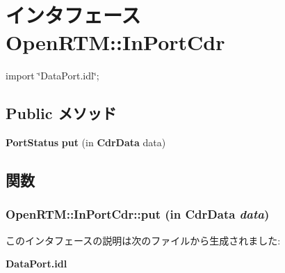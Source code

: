 \section{インタフェース OpenRTM::InPortCdr}
\label{interfaceOpenRTM_1_1InPortCdr}


{\ttfamily import \char`\"{}DataPort.idl\char`\"{};}

\subsection*{Public メソッド}
\begin{DoxyCompactItemize}
\item 
{\bf PortStatus} {\bf put} (in {\bf CdrData} data)
\end{DoxyCompactItemize}


\subsection{関数}
\subsubsection[{put}]{ OpenRTM::InPortCdr::put (in {\bf CdrData} {\em data})}\label{interfaceOpenRTM_1_1InPortCdr_a25c06cc0054c091c33dbe23398cc11c4}


このインタフェースの説明は次のファイルから生成されました:\begin{DoxyCompactItemize}
\item 
{\bf DataPort.idl}\end{DoxyCompactItemize}
